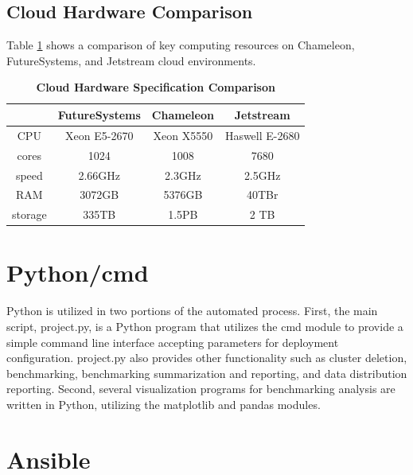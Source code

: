 \documentclass[9pt,twocolumn,twoside]{../../styles/osajnl}
\begin{document}
\subsection{Cloud Hardware Comparison}


Table \ref{tab:cloud-comparison} shows a comparison of key computing
resources on Chameleon, FutureSystems, and Jetstream cloud
environments.

\begin{table}[htbp]
\centering
\caption{\bf Cloud Hardware Specification Comparison \cite{www-chamHardware} \cite{www-kiloHardware} \cite{www-jetHardware}}

 \begin{tabular} {| c | c | c | c |}
\hline
  & FutureSystems &  Chameleon  & Jetstream \\ [0.5ex] 
 \hline

    
CPU     &  Xeon E5-2670 & Xeon X5550 & Haswell E-2680  \\
 \hline
cores   & 1024          &       1008 &  7680 \\
 \hline
speed   & 2.66GHz       &     2.3GHz & 2.5GHz\\
 \hline
RAM     & 3072GB        &    5376GB  &  40TBr\\
 \hline
storage & 335TB         &     1.5PB  & 2 TB\\ [1ex] 
 \hline

\end{tabular}
  \label{tab:cloud-comparison}
\end{table}

\section{Python/cmd}

Python is utilized in two portions of the automated process. First,
the main script, project.py, is a Python program that utilizes the cmd
module to provide a simple command line interface \cite{www-cmd}
accepting parameters for deployment configuration. project.py also
provides other functionality such as cluster deletion, benchmarking,
benchmarking summarization and reporting, and data distribution
reporting. Second, several visualization programs for benchmarking
analysis are written in Python, utilizing the matplotlib and pandas
modules.

\section{Ansible}
\end{document}
